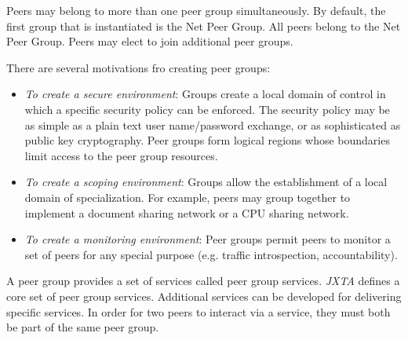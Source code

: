 Peers may belong to more than one peer group simultaneously. By default, the first group that is instantiated is the Net Peer Group. All peers belong to the Net Peer Group. Peers may elect to join additional peer groups.

There are several motivations fro creating peer groups:
\begin{itemize}
 \item \emph{To create a secure environment}: Groups create a local domain of control in which a specific security policy can be enforced. The security policy may be as simple as a plain text user name/password exchange, or as sophisticated as public key cryptography. Peer groups form logical regions whose boundaries limit access to the peer group resources.
 \item \emph{To create a scoping environment}: Groups allow the establishment of a local domain of specialization. For example, peers may group together to implement a document sharing network or a CPU sharing network.
 \item \emph{To create a monitoring environment}: Peer groups permit peers to monitor a set of peers for any special purpose (e.g. traffic introspection, accountability). 
\end{itemize}

A peer group provides a set of services called peer group services. \emph{JXTA} defines a core set of peer group services. Additional services can be developed for delivering specific services. In order for two peers to interact via a service, they must both be part of the same peer group.

